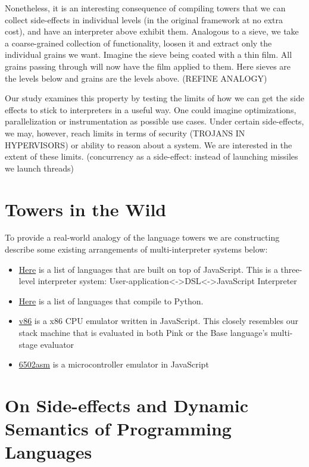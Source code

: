 \documentclass{article}
\theoremstyle{definition}
\begin{document}
Nonetheless, it is an interesting consequence of compiling towers that we can collect side-effects in individual levels (in the original framework at no extra cost), and have an interpreter
above exhibit them. Analogous to a sieve, we take a coarse-grained collection of functionality, loosen it and extract only the individual grains we want. Imagine the sieve being coated with a thin film. All grains passing through
will now have the film applied to them. Here sieves are the levels below and grains are the levels above. (REFINE ANALOGY)

Our study examines this property by testing the limits of how we can get the side effects to stick to interpreters in a useful way. One could imagine optimizations, parallelization or instrumentation as possible use cases. Under certain side-effects, we may, however,
reach limits in terms of security (TROJANS IN HYPERVISORS) or ability to reason about a system. We are interested in the extent of these limits. (concurrency as a side-effect: instead of launching missiles we launch threads)

\section{Towers in the Wild}
To provide a real-world analogy of the language towers we are constructing describe some existing arrangements of multi-interpreter systems below:
\begin{itemize}
	\item \href{https://github.com/jashkenas/coffeescript/wiki/List-of-languages-that-compile-to-JS}{Here} is a list of languages that are built on top of JavaScript. This is a three-level interpreter system: User-application<->DSL<->JavaScript Interpreter
	\item \href{https://github.com/vindarel/languages-that-compile-to-python#other-languages-that-target-the-python-platform}{Here} is a list of languages that compile to Python.
	\item \href{https://github.com/copy/v86}{v86} is a x86 CPU emulator written in JavaScript. This closely resembles our stack machine that is evaluated in both Pink or the Base language's multi-stage evaluator
	\item \href{http://6502asm.com/}{6502asm} is a microcontroller emulator in JavaScript
\end{itemize}

\section{On Side-effects and Dynamic Semantics of Programming Languages}
\end{document}
